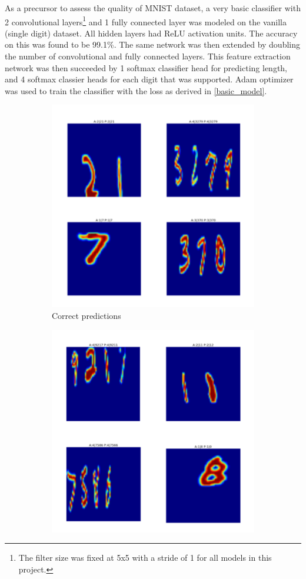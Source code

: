 \documentclass{article}
\begin{document}
	As a precursor to assess the quality of MNIST dataset, a very basic classifier with 2 convolutional layers\footnote{The filter size was fixed at 5x5 with a stride of 1 for all models in this project.} and 1 fully connected layer was modeled on the vanilla (single digit) dataset. All hidden layers had ReLU activation units. The accuracy on this was found to be 99.1\%. The same network was then extended by doubling the number of convolutional and fully connected layers. This feature extraction network was then succeeded by 1 softmax classifier head for predicting length, and 4 softmax classier heads for each digit that was supported. Adam optimizer was used to train the classifier with the loss as derived in \ref{basic_model}.
	
	\begin{figure}[h]
		\centering
		\begin{subfigure}[h]{0.4\textwidth}
			\centering
			\includegraphics[scale=0.4]{mnist_multi_predict_pos}
			\caption{Correct predictions}
			\label{fig:mnist_multi_predict_pos}
		\end{subfigure}
		\begin{subfigure}[h]{0.4\textwidth}
			\centering
			\includegraphics[scale=0.4]{mnist_multi_predict_neg}

\end{subfigure}
\end{figure}
\end{document}
